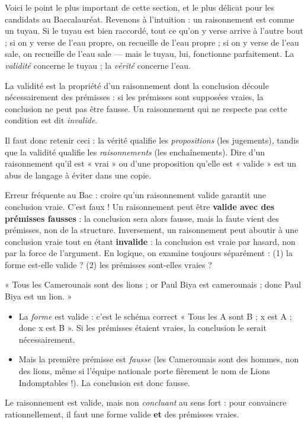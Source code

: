 \documentclass[11pt]{article}
\newcommand{\cle}[1]{{\popxbold\color{popdark}#1}}
\begin{document}
Voici le point le plus important de cette section, et le plus délicat pour les candidats au Baccalauréat. Revenons à l'intuition : un raisonnement est comme un tuyau. Si le tuyau est bien raccordé, tout ce qu'on y verse arrive à l'autre bout ; si on y verse de l'eau propre, on recueille de l'eau propre ; si on y verse de l'eau sale, on recueille de l'eau sale — mais le tuyau, lui, fonctionne parfaitement. La \emph{validité} concerne le tuyau ; la \emph{vérité} concerne l'eau.

\begin{definition}[Validité]
La \cle{validité} est la propriété d'un raisonnement dont la conclusion découle nécessairement des prémisses : si les prémisses sont supposées vraies, la conclusion ne peut pas être fausse. Un raisonnement qui ne respecte pas cette condition est dit \emph{invalide}.
\end{definition}

Il faut donc retenir ceci : la vérité qualifie les \emph{propositions} (les jugements), tandis que la validité qualifie les \emph{raisonnements} (les enchaînements). Dire d'un raisonnement qu'il est « vrai » ou d'une proposition qu'elle est « valide » est un abus de langage à éviter dans une copie.

\begin{attention}
Erreur fréquente au Bac : croire qu'un raisonnement valide garantit une conclusion vraie. C'est faux ! Un raisonnement peut être \textbf{valide avec des prémisses fausses} : la conclusion sera alors fausse, mais la faute vient des prémisses, non de la structure. Inversement, un raisonnement peut aboutir à une conclusion vraie tout en étant \textbf{invalide} : la conclusion est vraie par hasard, non par la force de l'argument. En logique, on examine toujours séparément : (1) la forme est-elle valide ? (2) les prémisses sont-elles vraies ?
\end{attention}

\begin{exemplebox}
« Tous les Camerounais sont des lions ; or Paul Biya est camerounais ; donc Paul Biya est un lion. »
\begin{itemize}
\item La \emph{forme} est valide : c'est le schéma correct « Tous les A sont B ; x est A ; donc x est B ». Si les prémisses étaient vraies, la conclusion le serait nécessairement.
\item Mais la première prémisse est \emph{fausse} (les Camerounais sont des hommes, non des lions, même si l'équipe nationale porte fièrement le nom de Lions Indomptables !). La conclusion est donc fausse.
\end{itemize}
Le raisonnement est valide, mais non \emph{concluant} au sens fort : pour convaincre rationnellement, il faut une forme valide \textbf{et} des prémisses vraies.
\end{exemplebox}
\end{document}
